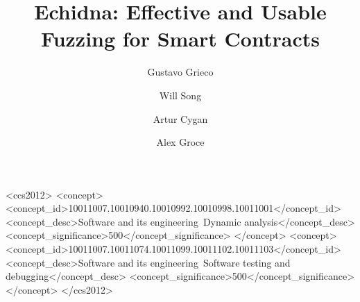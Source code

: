 \documentclass[sigconf]{acmart}
\author{Gustavo Grieco}
\author{Will Song}
\author{Artur Cygan}
\affiliation{\institution{Trail of Bits}}
\author{Alex Groce}
\affiliation{\institution{Northern Arizona University}}
\begin{document}
\title{Echidna: Effective and Usable Fuzzing for Smart Contracts}

\begin{CCSXML}
<ccs2012>
<concept>
<concept_id>10011007.10010940.10010992.10010998.10011001</concept_id>
<concept_desc>Software and its engineering~Dynamic analysis</concept_desc>
<concept_significance>500</concept_significance>
</concept>
<concept>
<concept_id>10011007.10011074.10011099.10011102.10011103</concept_id>
<concept_desc>Software and its engineering~Software testing and debugging</concept_desc>
<concept_significance>500</concept_significance>
</concept>
</ccs2012>
\end{CCSXML}




\begin{abstract}

\end{abstract}

\maketitle 










\end{document}
